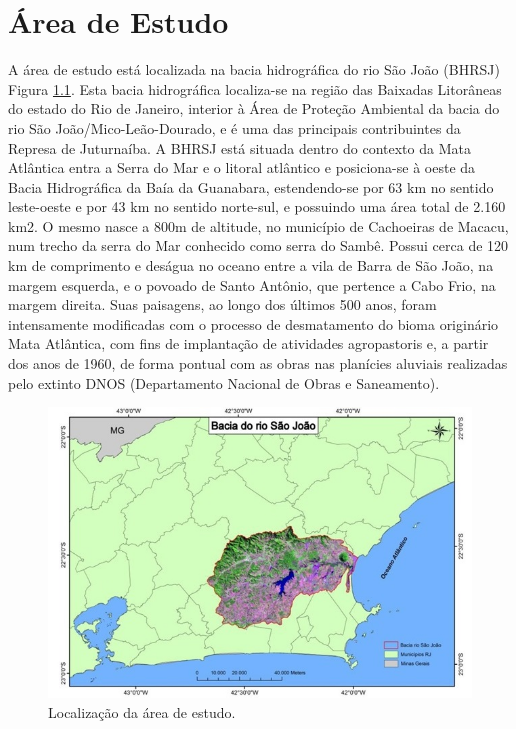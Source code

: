 \chapter{Área de Estudo}
A área de estudo está localizada na bacia hidrográfica do rio São João (BHRSJ) Figura \ref{fig:locareaestudo}. Esta bacia hidrográfica localiza-se na região das Baixadas Litorâneas do estado do Rio de Janeiro, interior à Área de Proteção Ambiental da bacia do rio São João/Mico-Leão-Dourado, e é uma das principais contribuintes da Represa de Juturnaíba. A BHRSJ está situada dentro do contexto da Mata Atlântica entra a Serra do Mar e o litoral atlântico e posiciona-se à oeste da Bacia Hidrográfica da Baía da Guanabara, estendendo-se por 63 km no sentido leste-oeste e por 43 km no sentido norte-sul, e possuindo uma área total de 2.160 km2. O mesmo nasce a 800m de altitude, no município de Cachoeiras de Macacu, num trecho da serra do Mar conhecido como serra do Sambê. Possui cerca de 120 km de comprimento e deságua no oceano entre a vila de Barra de São João, na margem esquerda, e o povoado de Santo Antônio, que pertence a Cabo Frio, na margem direita. Suas paisagens, ao longo dos últimos 500 anos, foram intensamente modificadas com o processo de desmatamento do bioma originário Mata Atlântica, com fins de implantação de atividades agropastoris e, a partir dos anos de 1960, de forma pontual com as obras nas planícies aluviais realizadas pelo extinto DNOS (Departamento Nacional de Obras e Saneamento). \\

	\begin{figure}
		\centering
		\includegraphics[width=0.9\linewidth]{data/BHRSJ.jpg}
		\caption{Localização da área de estudo.}
		\label{fig:locareaestudo}
	\end{figure}


